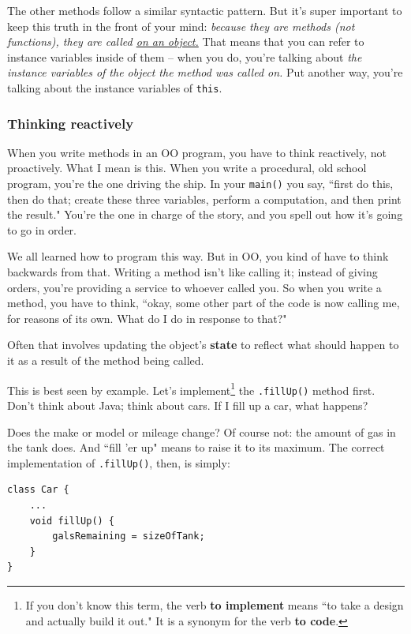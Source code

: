 The other methods follow a similar syntactic pattern. But it's super important
to keep this truth in the front of your mind: \textit{because they are methods
(not functions), they are called \underline{on an object.}} That means that
you can refer to instance variables inside of them -- when you do, you're
talking about \textit{the instance variables of the object the method was
called on.} Put another way, you're talking about the instance variables of
\texttt{this}.

\subsubsection{Thinking reactively}

When you write methods in an OO program, you have to think reactively, not
proactively. What I mean is this. When you write a procedural, old school
program, you're the one driving the ship. In your \texttt{main()} you say,
``first do this, then do that; create these three variables, perform a
computation, and then print the result." You're the one in charge of the
story, and you spell out how it's going to go in order.

We all learned how to program this way. But in OO, you kind of have to think
backwards from that. Writing a method isn't like calling it; instead of giving
orders, you're providing a service to whoever called you. So when you write a
method, you have to think, ``okay, some other part of the code is now calling
me, for reasons of its own. What do I do in response to that?"

Often that involves updating the object's \textbf{state} to reflect what
should happen to it as a result of the method being called.

This is best seen by example. Let's implement\footnote{If you don't know this
term, the verb \textbf{to implement} means ``to take a design and actually
build it out." It is a synonym for the verb \textbf{to code}.} the
\texttt{.fillUp()} method first. Don't think about Java; think about cars. If
I fill up a car, what happens?

Does the make or model or mileage change? Of course not: the amount of gas in
the tank does. And ``fill 'er up" means to raise it to its maximum. The
correct implementation of \texttt{.fillUp()}, then, is simply:

\begin{Verbatim}[samepage=true,fontsize=\footnotesize,frame=single]
class Car {
    ...
    void fillUp() {
        galsRemaining = sizeOfTank;
    }
}
\end{Verbatim}


